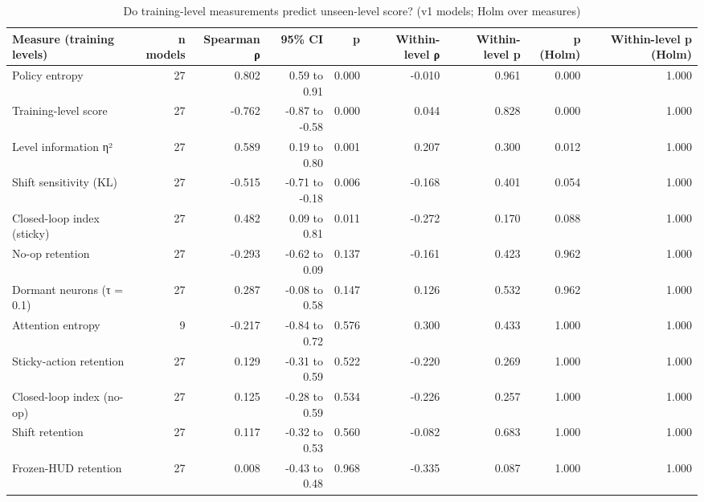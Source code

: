 \begin{table}[t]
\centering
\caption{Do training-level measurements predict unseen-level score? (v1 models; Holm over measures)}
\label{tab:predictors_of_transfer}
\begin{tabular}{lrrrrrrrr}
\toprule
Measure (training levels) & n models & Spearman ρ & 95\% CI & p & Within-level ρ & Within-level p & p (Holm) & Within-level p (Holm) \\
\midrule
Policy entropy & 27 & 0.802 & 0.59 to 0.91 & 0.000 & -0.010 & 0.961 & 0.000 & 1.000 \\
Training-level score & 27 & -0.762 & -0.87 to -0.58 & 0.000 & 0.044 & 0.828 & 0.000 & 1.000 \\
Level information η² & 27 & 0.589 & 0.19 to 0.80 & 0.001 & 0.207 & 0.300 & 0.012 & 1.000 \\
Shift sensitivity (KL) & 27 & -0.515 & -0.71 to -0.18 & 0.006 & -0.168 & 0.401 & 0.054 & 1.000 \\
Closed-loop index (sticky) & 27 & 0.482 & 0.09 to 0.81 & 0.011 & -0.272 & 0.170 & 0.088 & 1.000 \\
No-op retention & 27 & -0.293 & -0.62 to 0.09 & 0.137 & -0.161 & 0.423 & 0.962 & 1.000 \\
Dormant neurons (τ = 0.1) & 27 & 0.287 & -0.08 to 0.58 & 0.147 & 0.126 & 0.532 & 0.962 & 1.000 \\
Attention entropy & 9 & -0.217 & -0.84 to 0.72 & 0.576 & 0.300 & 0.433 & 1.000 & 1.000 \\
Sticky-action retention & 27 & 0.129 & -0.31 to 0.59 & 0.522 & -0.220 & 0.269 & 1.000 & 1.000 \\
Closed-loop index (no-op) & 27 & 0.125 & -0.28 to 0.59 & 0.534 & -0.226 & 0.257 & 1.000 & 1.000 \\
Shift retention & 27 & 0.117 & -0.32 to 0.53 & 0.560 & -0.082 & 0.683 & 1.000 & 1.000 \\
Frozen-HUD retention & 27 & 0.008 & -0.43 to 0.48 & 0.968 & -0.335 & 0.087 & 1.000 & 1.000 \\
\bottomrule
\end{tabular}
\end{table}
